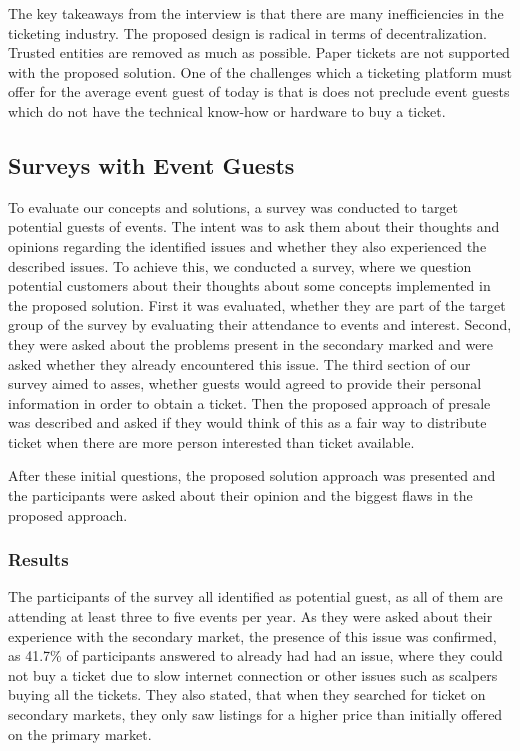 The key takeaways from the interview is that there are many inefficiencies in the ticketing industry. The proposed design is radical in terms of decentralization. Trusted entities are removed as much as possible. Paper tickets are not supported with the proposed solution. One of the challenges which a ticketing platform must offer for the average event guest of today is that is does not preclude event guests which do not have the technical know-how or hardware to buy a ticket.

\subsection{Surveys with Event Guests}

To evaluate our concepts and solutions, a survey was conducted to target potential guests of events. The intent was to ask them about their thoughts and opinions regarding the identified issues and whether they also experienced the described issues. To achieve this, we conducted a survey, where we question potential customers about their thoughts about some concepts implemented in the proposed solution. First it was evaluated, whether they are part of the target group of the survey by evaluating their attendance to events and interest. 
Second, they were asked about the problems present in the secondary marked and were asked whether they already encountered this issue. The third section of our survey aimed to asses, whether guests would agreed to provide their personal information in order to obtain a  ticket. Then the proposed approach of presale was described and asked if they would think of this as a fair way to distribute ticket when there are more person interested than ticket available. 

After these initial questions, the proposed solution approach was presented and the participants were asked about their opinion and the biggest flaws in the proposed approach.

\subsubsection{Results}
The participants of the survey all identified as potential guest, as all of them are attending at least three to five events per year. As they were asked about their experience with the secondary market, the presence of this issue was confirmed, as 41.7\% of participants answered to already had had an issue, where they could not buy a ticket due to slow internet connection or other issues such as scalpers buying all the tickets. They also stated, that when they searched for ticket on secondary markets, they only saw listings for a higher price than initially offered on the primary market.

